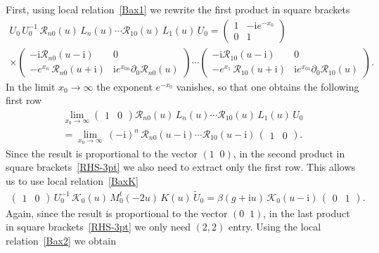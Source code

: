 \documentclass[11pt]{article}
\numberwithin{equation}{section}
\theoremstyle{plain}
\theoremstyle{definition}
\renewcommand{\imath}{\mathrm{i}}
\begin{document}
First, using local relation~\eqref{Bax1} we rewrite the first product in square brackets 
\begin{multline}
U_0 \, U^{-1}_0\,\mathcal{R}_{n0}(u) \, L_n(u) \cdots 
\mathcal{R}_{10}(u) \, L_1(u) \,U_0 = \begin{pmatrix}
	1 & -\imath e^{-x_0} \\[4pt]
	0 & 1
\end{pmatrix} \\[6pt] 
\times
\begin{pmatrix}
-\imath\mathcal{R}_{n0}(u-\imath) & 0 \\[4pt]
-e^{x_n}\,\mathcal{R}_{n0}(u+\imath) & 
\imath e^{x_{0n}}\partial_0 \mathcal{R}_{n0}(u)
	\end{pmatrix}
\cdots
\begin{pmatrix}
-\imath\mathcal{R}_{10}(u-\imath) & 0 \\[4pt]
-e^{x_1}\,\mathcal{R}_{10}(u+\imath) & 
\imath e^{x_{01}}\partial_0 \mathcal{R}_{10}(u)
	\end{pmatrix}.
\end{multline}
In the limit $x_0 \to \infty$ the exponent $e^{-x_0}$ vanishes, so that one obtains the following first row  
\begin{multline}
\lim_{x_0 \to \infty} \begin{pmatrix}
1 & 0 
\end{pmatrix} 
\mathcal{R}_{n0}(u) \, L_n(u) \cdots 
\mathcal{R}_{10}(u) \, L_1(u) \,U_0 \\
= \lim_{x_0 \to \infty} \, (-\imath)^n\,\mathcal{R}_{n0}(u-\imath)\cdots\mathcal{R}_{10}(u-\imath)\,
\begin{pmatrix}
1 & 0 
\end{pmatrix}.
\end{multline}
Since the result is proportional to the vector $(1 \;\; 0)$, in the second product in square brackets~\eqref{RHS-3pt} we also need to extract only the first row. This allows us to use local relation~\eqref{BaxK} 
\begin{align}
	\begin{pmatrix}
		1 & 0 
	\end{pmatrix}\,
	U^{-1}_0\,\mathcal{K}_0(u) \, M^t_0(-2u) \, K(u) \,\widetilde{U}_0= \beta (g + \imath u) \, \mathcal{K}_0(u-\imath) \, 
	\begin{pmatrix}
		0 & 1
	\end{pmatrix}.
\end{align}
Again, since the result is proportional to the vector $(0 \; \; 1)$, in the last product in square brackets~\eqref{RHS-3pt} we only need $(2,2)$ entry. Using the local relation~\eqref{Bax2} we obtain
\end{document}
